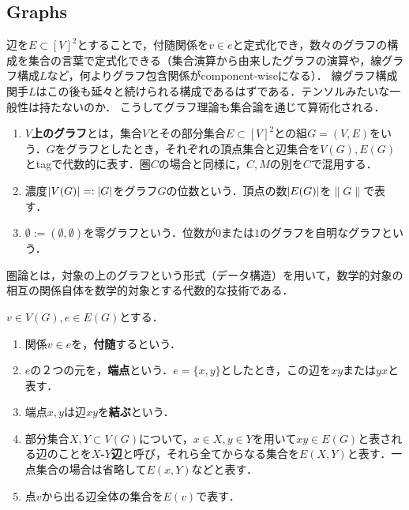 \documentclass[uplatex,dvipdfmx]{jsreport}
\begin{document}
\subsection{Graphs}

\begin{tcolorbox}[colframe=ForestGreen, colback=ForestGreen!10!white, breakable ,colbacktitle=ForestGreen!40!white, coltitle=black,fonttitle=\bfseries\sffamily,
    title=全体のポイント]
    辺を$E\subset[V]^2$とすることで，付随関係を$v\in e$と定式化でき，数々のグラフの構成を集合の言葉で定式化できる（集合演算から由来したグラフの演算や，線グラフ構成$L$など，何よりグラフ包含関係がcomponent-wiseになる）．
    線グラフ構成関手$L$はこの後も延々と続けられる構成であるはずである．テンソルみたいな一般性は持たないのか．
    こうしてグラフ理論も集合論を通じて算術化される．
\end{tcolorbox}

\begin{definition}\mbox{}
    \begin{enumerate}
        \item \textbf{$V$上のグラフ}とは，集合$V$とその部分集合$E\subset[V]^2$との組$G=(V,E)$をいう．$G$をグラフとしたとき，それぞれの頂点集合と辺集合を$V(G),E(G)$とtagで代数的に表す．圏$C$の場合と同様に，$C,M$の別を$C$で混用する．
        \item 濃度$\lvert V(G)\rvert=:\lvert G\rvert$をグラフ$G$の位数という．頂点の数$\lvert E(G)\rvert$を$\|G\|$で表す．
        \item $\emptyset:=(\emptyset,\emptyset)$を零グラフという．位数が$0$または$1$のグラフを自明なグラフという．
    \end{enumerate}
\end{definition}
\begin{remarks}
    圏論とは，対象の上のグラフという形式（データ構造）を用いて，数学的対象の相互の関係自体を数学的対象とする代数的な技術である．
\end{remarks}

\begin{definition}
    $v\in V(G),e\in E(G)$とする．
    \begin{enumerate}
        \item 関係$v\in e$を，\textbf{付随}するという．
        \item $e$の２つの元を，\textbf{端点}という．$e=\{x,y\}$としたとき，この辺を$xy$または$yx$と表す．
        \item 端点$x,y$は辺$xy$を\textbf{結ぶ}という．
        \item 部分集合$X,Y\subset V(G)$について，$x\in X,y\in Y$を用いて$xy\in E(G)$と表される辺のことを\textbf{$X$-$Y$辺}と呼び，それら全てからなる集合を$E(X,Y)$と表す．一点集合の場合は省略して$E(x,Y)$などと表す．
        \item 点$v$から出る辺全体の集合を$E(v)$で表す．
    \end{enumerate}
\end{definition}
\end{document}
